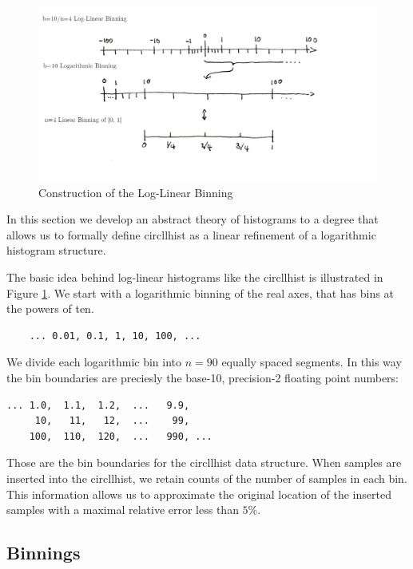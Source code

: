 \documentclass{article}
\theoremstyle{plain}
\theoremstyle{remark}
\begin{document}
\begin{figure}
  \includegraphics[width=\textwidth]{assets/LLBins.png}
  \caption{Construction of the Log-Linear Binning}
  \label{fig:llbins}
\end{figure}

In this section we develop an abstract theory of histograms to a degree that allows us to
formally define circllhist as a linear refinement of a logarithmic histogram structure.

The basic idea behind log-linear histograms like the circllhist is illustrated in Figure \ref{fig:llbins}.
We start with a logarithmic binning of the real axes, that has bins at the powers of ten.
\begin{center}
  \begin{BVerbatim}
    ... 0.01, 0.1, 1, 10, 100, ...
  \end{BVerbatim}
\end{center}
We divide each logarithmic bin into $n=90$ equally spaced segments. In this way the bin boundaries
are preciesly the base-10, precision-2 floating point numbers:
\begin{center}
\begin{BVerbatim}
... 1.0,  1.1,  1.2,  ...   9.9,
     10,   11,   12,  ...    99,
    100,  110,  120,  ...   990, ...
\end{BVerbatim}
\end{center}
Those are the bin boundaries for the circllhist data structure.
When samples are inserted into the circllhist, we retain counts of the number of samples in each bin.
This information allows us to approximate the original location of the inserted samples with a
maximal relative error less than $5\%$.

\subsection{Binnings}
\end{document}
